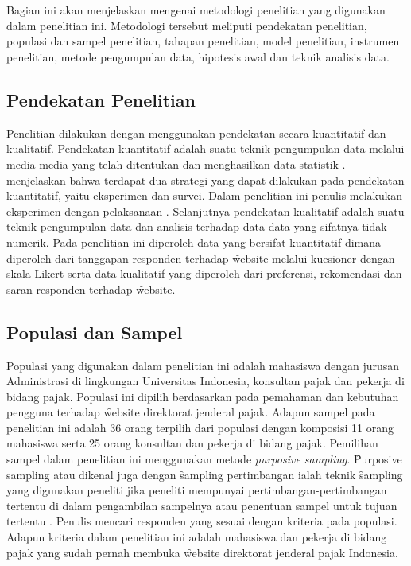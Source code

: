 \chapter{\babTiga}
Bagian ini akan menjelaskan mengenai metodologi penelitian yang digunakan dalam penelitian ini. Metodologi tersebut meliputi pendekatan penelitian, populasi dan sampel penelitian, tahapan penelitian, model penelitian, instrumen penelitian, metode pengumpulan data, hipotesis awal dan teknik analisis data.
\section{Pendekatan Penelitian}
Penelitian dilakukan dengan menggunakan pendekatan secara kuantitatif dan kualitatif. Pendekatan kuantitatif adalah suatu teknik pengumpulan data melalui media-media yang telah ditentukan dan menghasilkan data statistik \citep{buku.creswell}. \citeauthor{buku.creswell} menjelaskan bahwa terdapat dua strategi yang dapat dilakukan pada pendekatan kuantitatif, yaitu eksperimen dan survei. Dalam penelitian ini penulis melakukan eksperimen dengan pelaksanaan \ust. Selanjutnya pendekatan kualitatif adalah suatu teknik pengumpulan data dan analisis terhadap data-data yang sifatnya tidak numerik. Pada penelitian ini diperoleh data yang bersifat kuantitatif dimana diperoleh dari tanggapan responden terhadap \f{website} melalui kuesioner dengan skala Likert serta data kualitatif yang diperoleh dari preferensi, rekomendasi dan saran responden terhadap \f{website}.
\section{Populasi dan Sampel}
Populasi yang digunakan dalam penelitian ini adalah mahasiswa dengan jurusan Administrasi di lingkungan Universitas Indonesia, konsultan pajak dan pekerja di bidang pajak. Populasi ini dipilih berdasarkan pada pemahaman dan kebutuhan pengguna terhadap \f{website} direktorat jenderal pajak. Adapun sampel pada penelitian ini adalah 36 orang terpilih dari populasi dengan komposisi 11 orang mahasiswa serta 25 orang konsultan dan pekerja di bidang pajak. Pemilihan sampel dalam penelitian ini menggunakan metode \textit{purposive sampling}. \f{Purposive sampling} atau dikenal juga dengan \f{sampling} pertimbangan ialah teknik \f{sampling} yang digunakan peneliti jika peneliti mempunyai pertimbangan-pertimbangan tertentu di dalam pengambilan sampelnya atau penentuan sampel untuk tujuan tertentu \citep{buku.riduwan}. Penulis mencari responden yang sesuai dengan kriteria pada populasi. Adapun kriteria dalam penelitian ini adalah mahasiswa dan pekerja di bidang pajak yang sudah pernah membuka \f{website} direktorat jenderal pajak Indonesia.
